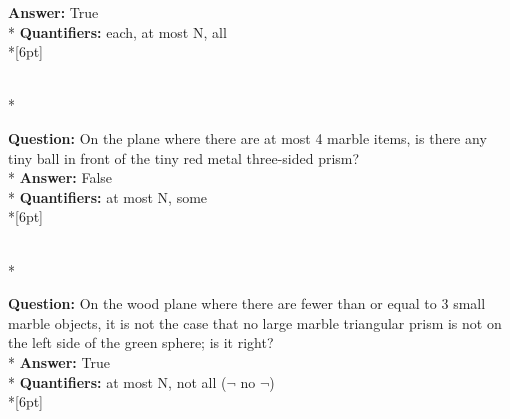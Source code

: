 \begin{figure*}
\begin{minipage}{0.48\textwidth}
\begin{minipage}[t][2.2cm][t]{1\textwidth}
      \textbf{Answer:} True \\*
      \textbf{Quantifiers:} each, at most N, all \\*[6pt]
    \end{minipage}\\*
    \begin{minipage}[t][2.2cm][t]{1\textwidth}
      \footnotesize
      \textbf{Question:} On the plane where there are at most 4 marble items, is there any tiny ball in front of the tiny red metal three-sided prism? \\*
      \textbf{Answer:} False \\*
      \textbf{Quantifiers:} at most N, some \\*[6pt]
    \end{minipage}\\*
    \begin{minipage}[t][2.2cm][t]{1\textwidth}
      \footnotesize
      \textbf{Question:} On the wood plane where there are fewer than or equal to 3 small marble objects, it is not the case that no large marble triangular prism is not on the left side of the green sphere; is it right? \\*
      \textbf{Answer:} True \\*
      \textbf{Quantifiers:} at most N, not all ($\neg$ no $\neg$) \\*[6pt]
    \end{minipage}
  \end{minipage}
\end{figure*}




